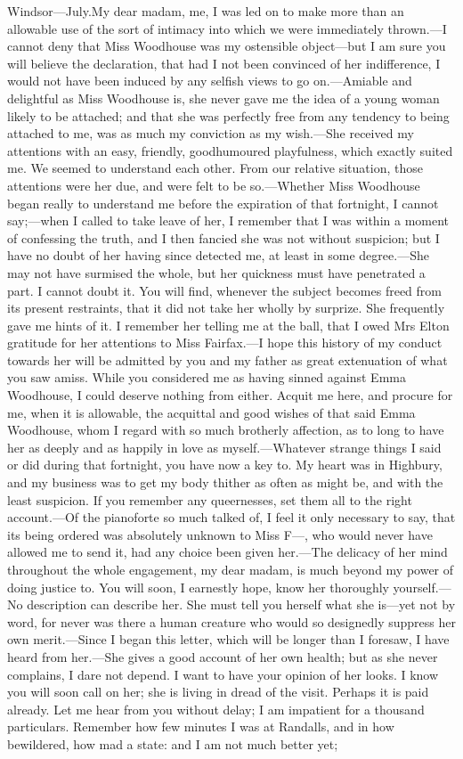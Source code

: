 \begin{mail}{Windsor—July.}{My dear madam,}
me, I was led on to make more than an allowable use of the sort of intimacy into which we were immediately thrown.—I cannot deny that Miss Woodhouse was my ostensible object—but I am sure you will believe the declaration, that had I not been convinced of her indifference, I would not have been induced by any selfish views to go on.—Amiable and delightful as Miss Woodhouse is, she never gave me the idea of a young woman likely to be attached; and that she was perfectly free from any tendency to being attached to me, was as much my conviction as my wish.—She received my attentions with an easy, friendly, goodhumoured playfulness, which exactly suited me. We seemed to understand each other. From our relative situation, those attentions were her due, and were felt to be so.—Whether Miss Woodhouse began really to understand me before the expiration of that fortnight, I cannot say;—when I called to take leave of her, I remember that I was within a moment of confessing the truth, and I then fancied she was not without suspicion; but I have no doubt of her having since detected me, at least in some degree.—She may not have surmised the whole, but her quickness must have penetrated a part. I cannot doubt it. You will find, whenever the subject becomes freed from its present restraints, that it did not take her wholly by surprize. She frequently gave me hints of it. I remember her telling me at the ball, that I owed Mrs Elton gratitude for her attentions to Miss Fairfax.—I hope this history of my conduct towards her will be admitted by you and my father as great extenuation of what you saw amiss. While you considered me as having sinned against Emma Woodhouse, I could deserve nothing from either. Acquit me here, and procure for me, when it is allowable, the acquittal and good wishes of that said Emma Woodhouse, whom I regard with so much brotherly affection, as to long to have her as deeply and as happily in love as myself.—Whatever strange things I said or did during that fortnight, you have now a key to. My heart was in Highbury, and my business was to get my body thither as often as might be, and with the least suspicion. If you remember any queernesses, set them all to the right account.—Of the pianoforte so much talked of, I feel it only necessary to say, that its being ordered was absolutely unknown to Miss F—, who would never have allowed me to send it, had any choice been given her.—The delicacy of her mind throughout the whole engagement, my dear madam, is much beyond my power of doing justice to. You will soon, I earnestly hope, know her thoroughly yourself.—No description can describe her. She must tell you herself what she is—yet not by word, for never was there a human creature who would so designedly suppress her own merit.—Since I began this letter, which will be longer than I foresaw, I have heard from her.—She gives a good account of her own health; but as she never complains, I dare not depend. I want to have your opinion of her looks. I know you will soon call on her; she is living in dread of the visit. Perhaps it is paid already. Let me hear from you without delay; I am impatient for a thousand particulars. Remember how few minutes I was at Randalls, and in how bewildered, how mad a state: and I am not much better yet; 
\end{mail}
